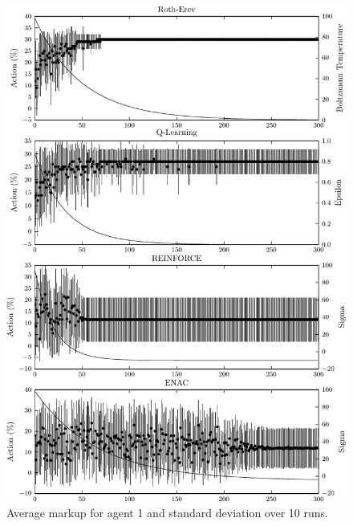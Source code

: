 \begin{figure}
  \centering
  \includegraphics{figures/fig5_1_action_a1}
  \caption{Average markup for agent 1 and standard deviation over 10 runs.}
  \label{fig:5_1_action_a1}
\end{figure}

